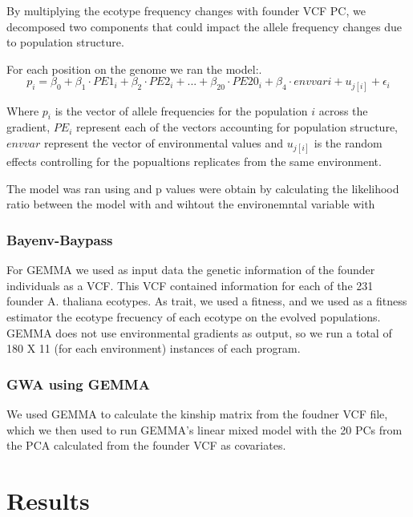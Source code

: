 \documentclass{article}
\begin{document}
By multiplying the ecotype frequency changes with founder VCF PC, we decomposed two components that could impact the allele frequency changes due to population structure.

For each position on the genome we ran the model:.
\begin{equation}
    p_{i} = \beta_{0} + \beta_{1} \cdot PE1_{i} + \beta_{2} \cdot PE2_{i} + ... + \beta_{20} \cdot PE20_{i} + \beta_{4} \cdot envvar{i} + u_{j[i]} + \epsilon_{i}
\end{equation}

Where $p_{i}$ is the vector of allele frequencies for the population $i$  across the gradient, $PE_{i}$ represent each of the vectors accounting for population structure, $env var$ represent the vector of environmental values and $u_{j[i]}$ is the random effects controlling for the popualtions replicates from the same environment. 

The model was ran using \citep{Bates2015-rh} and p values were obtain by calculating the likelihood ratio between the model with and wihtout the environemntal variable with \citep{Kuznetsova2017-ki}

\subsubsection{Bayenv-Baypass}

For GEMMA %
we used as input data the genetic information of the founder individuals as a VCF. This VCF contained information for each of the 231 founder A. thaliana ecotypes. As trait, we used a fitness, and we used as a fitness estimator the ecotype frecuency of each ecotype on the evolved populations. 
GEMMA %
does not use environmental gradients as output, so we run a total of 180 X 11 (for each environment) instances of each program. 

\subsubsection{GWA using GEMMA}
We used GEMMA to calculate the kinship matrix from the foudner VCF file, which we then used to run GEMMA's linear mixed model with the 20 PCs from the PCA calculated from the founder VCF as covariates. 


\section{Results}
\end{document}
